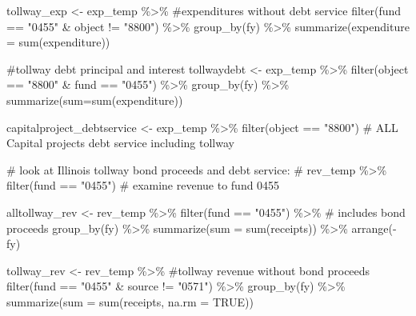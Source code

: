 \documentclass[
  letterpaper,
  DIV=11,
  numbers=noendperiod]{scrreport}
\newenvironment{Shaded}{\begin{snugshade}}{\end{snugshade}}
\newcommand{\AttributeTok}[1]{\textcolor[rgb]{0.40,0.45,0.13}{#1}}
\newcommand{\CommentTok}[1]{\textcolor[rgb]{0.37,0.37,0.37}{#1}}
\newcommand{\ConstantTok}[1]{\textcolor[rgb]{0.56,0.35,0.01}{#1}}
\newcommand{\FunctionTok}[1]{\textcolor[rgb]{0.28,0.35,0.67}{#1}}
\newcommand{\NormalTok}[1]{\textcolor[rgb]{0.00,0.23,0.31}{#1}}
\newcommand{\OtherTok}[1]{\textcolor[rgb]{0.00,0.23,0.31}{#1}}
\newcommand{\SpecialCharTok}[1]{\textcolor[rgb]{0.37,0.37,0.37}{#1}}
\newcommand{\StringTok}[1]{\textcolor[rgb]{0.13,0.47,0.30}{#1}}
\begin{document}
\begin{Shaded}
\begin{Highlighting}[]
\NormalTok{tollway\_exp }\OtherTok{\textless{}{-}}\NormalTok{ exp\_temp }\SpecialCharTok{\%\textgreater{}\%} \CommentTok{\#expenditures without debt service}
  \FunctionTok{filter}\NormalTok{(fund }\SpecialCharTok{==} \StringTok{"0455"} \SpecialCharTok{\&}\NormalTok{ object }\SpecialCharTok{!=} \StringTok{"8800"}\NormalTok{) }\SpecialCharTok{\%\textgreater{}\%} 
  \FunctionTok{group\_by}\NormalTok{(fy) }\SpecialCharTok{\%\textgreater{}\%} 
  \FunctionTok{summarize}\NormalTok{(}\AttributeTok{expenditure =} \FunctionTok{sum}\NormalTok{(expenditure))}

\CommentTok{\#tollway debt principal and interest}
\NormalTok{tollwaydebt }\OtherTok{\textless{}{-}}\NormalTok{ exp\_temp }\SpecialCharTok{\%\textgreater{}\%}
  \FunctionTok{filter}\NormalTok{(object }\SpecialCharTok{==} \StringTok{"8800"} \SpecialCharTok{\&}\NormalTok{ fund }\SpecialCharTok{==} \StringTok{"0455"}\NormalTok{) }\SpecialCharTok{\%\textgreater{}\%} 
  \FunctionTok{group\_by}\NormalTok{(fy) }\SpecialCharTok{\%\textgreater{}\%} 
  \FunctionTok{summarize}\NormalTok{(}\AttributeTok{sum=}\FunctionTok{sum}\NormalTok{(expenditure)) }


\NormalTok{capitalproject\_debtservice }\OtherTok{\textless{}{-}}\NormalTok{ exp\_temp }\SpecialCharTok{\%\textgreater{}\%}
  \FunctionTok{filter}\NormalTok{(object }\SpecialCharTok{==} \StringTok{"8800"}\NormalTok{) }\CommentTok{\# ALL Capital projects debt service including tollway}

\CommentTok{\# look at Illinois tollway bond proceeds and debt service: }
\CommentTok{\# rev\_temp \%\textgreater{}\% filter(fund == "0455") \# examine revenue to fund 0455}


\NormalTok{alltollway\_rev }\OtherTok{\textless{}{-}}\NormalTok{ rev\_temp }\SpecialCharTok{\%\textgreater{}\%} 
  \FunctionTok{filter}\NormalTok{(fund }\SpecialCharTok{==} \StringTok{"0455"}\NormalTok{) }\SpecialCharTok{\%\textgreater{}\%}  \CommentTok{\# includes bond proceeds}
  \FunctionTok{group\_by}\NormalTok{(fy) }\SpecialCharTok{\%\textgreater{}\%} 
  \FunctionTok{summarize}\NormalTok{(}\AttributeTok{sum =} \FunctionTok{sum}\NormalTok{(receipts)) }\SpecialCharTok{\%\textgreater{}\%} 
  \FunctionTok{arrange}\NormalTok{(}\SpecialCharTok{{-}}\NormalTok{fy)}

\NormalTok{tollway\_rev }\OtherTok{\textless{}{-}}\NormalTok{ rev\_temp }\SpecialCharTok{\%\textgreater{}\%} \CommentTok{\#tollway revenue without bond proceeds}
  \FunctionTok{filter}\NormalTok{(fund }\SpecialCharTok{==} \StringTok{"0455"} \SpecialCharTok{\&}\NormalTok{ source }\SpecialCharTok{!=} \StringTok{"0571"}\NormalTok{) }\SpecialCharTok{\%\textgreater{}\%} 
  \FunctionTok{group\_by}\NormalTok{(fy) }\SpecialCharTok{\%\textgreater{}\%} 
  \FunctionTok{summarize}\NormalTok{(}\AttributeTok{sum =} \FunctionTok{sum}\NormalTok{(receipts, }\AttributeTok{na.rm =} \ConstantTok{TRUE}\NormalTok{))}




\end{Highlighting}
\end{Shaded}
\end{document}
